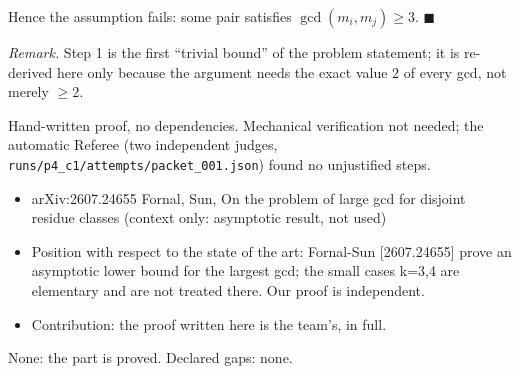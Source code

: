 Hence the assumption fails: some pair satisfies \(\gcd(m_i,m_j)\ge3\).
\(\blacksquare\)

\emph{Remark.} Step 1 is the first ``trivial bound'' of the problem
statement; it is re-derived here only because the argument needs the
exact value \(2\) of every gcd, not merely \(\ge2\).


Hand-written proof, no dependencies. Mechanical verification not needed;
the automatic Referee (two independent judges,
\texttt{runs/p4\_c1/attempts/packet\_001.json}) found no unjustified
steps.


\begin{itemize}
\tightlist
\item
  arXiv:2607.24655 Fornal, Sun, On the problem of large gcd for disjoint
  residue classes (context only: asymptotic result, not used)
\item
  Position with respect to the state of the art: Fornal-Sun
  {[}2607.24655{]} prove an asymptotic lower bound for the largest gcd;
  the small cases k=3,4 are elementary and are not treated there. Our
  proof is independent.
\item
  Contribution: the proof written here is the team's, in full.
\end{itemize}


None: the part is proved. Declared gaps: none.


